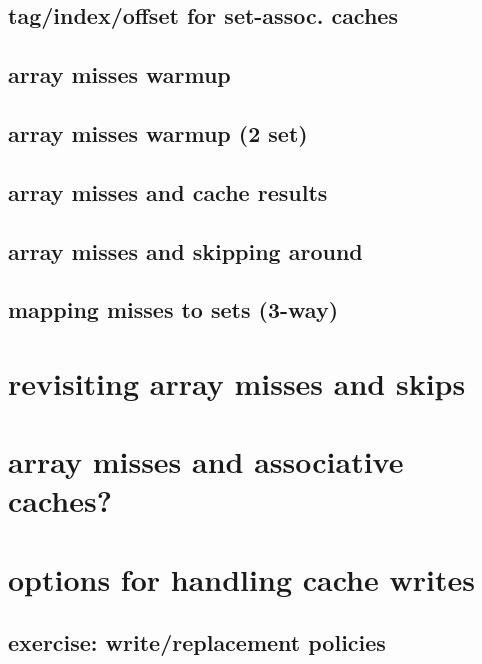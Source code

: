 \subsection{tag/index/offset for set-assoc. caches}


\subsection{array misses warmup}


\subsection{array misses warmup (2 set)}


\subsection{array misses and cache results}


\subsection{array misses and skipping around}


\subsection{mapping misses to sets (3-way)}


\section{revisiting array misses and skips}

\section{array misses and associative caches?}


\section{options for handling cache writes}


\subsection{exercise: write/replacement policies}


